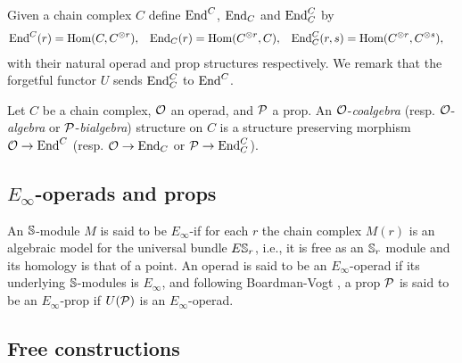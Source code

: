 Given a chain complex $C$ define $\End^C$, $\End_C$ and $\End_C^C$ by
\begin{align*}
\End^C(r) &= \Hom(C, C^{\otimes r}),
& \End_C(r) &= \Hom(C^{\otimes r}, C),
& \End^C_C(r, s) &= \Hom(C^{\otimes r}, C^{\otimes s}),
\end{align*}
with their natural operad and prop structures respectively.
We remark that the forgetful functor $U$ sends $\End^C_C$ to $\End^C$.

Let $C$ be a chain complex, $\O$ an operad, and $\P$ a prop.
An $\O$-\textit{coalgebra} (resp. $\O$-\textit{algebra} or $\P$-\textit{bialgebra}) structure on $C$ is a structure preserving morphism $\O \to \End^C$ (resp. $\O \to \End_C$ or $\P \to \End_C^C$).

\subsection{$E_\infty$-operads and props}

An $\S$-module $M$ is said to be $E_\infty$-if for each $r$ the chain complex $M(r)$ is an algebraic model for the universal bundle $E\S_r$, i.e., it is free as an $\S_r$ module and its homology is that of a point.
An operad is said to be an $E_\infty$-operad if its underlying $\S$-modules is $E_\infty$, and following Boardman-Vogt \cite{boardman1973homotopy}, a prop $\P$ is said to be an $E_\infty$-prop if $U(\P)$ is an $E_\infty$-operad.

\subsection{Free constructions}


